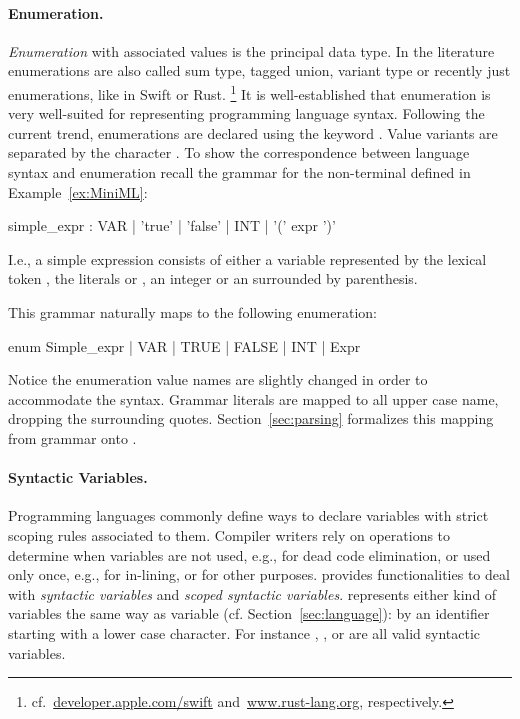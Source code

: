 \paragraph{Enumeration.} 
\emph{Enumeration} with associated values is the principal \Tosca data type.
In the literature enumerations are also called sum type, tagged union, 
variant type or recently just enumerations, like in Swift or Rust.%
\footnote{cf.~\href{https://developer.apple.com/swift/}{developer.apple.com/swift} 
and~\href{https://www.rust-lang.org/}{www.rust-lang.org}, respectively.}
It is well-established that enumeration is very well-suited for
 representing programming language syntax.
 Following the current trend, \Tosca enumerations are declared
 using the keyword .  Value variants are separated
 by the character \ToscaIn{|}. To show the correspondence between
 language syntax and enumeration recall the \antlr grammar for 
 the non-terminal  defined in Example~\ref{ex:MiniML}:
%
\begin{lstANTLR}
simple_expr : VAR | 'true' | 'false' | INT
            | '(' expr ')' 
\end{lstANTLR}
%
I.e., a simple expression consists of either a variable represented by the
lexical token , the literals  or
, an integer or an  surrounded by
parenthesis. 

\begin{example}

This grammar naturally maps to the following enumeration:
%  
\begin{lstTosca}
enum Simple_expr | VAR | TRUE | FALSE 
                   | INT | Expr
\end{lstTosca}

\end{example}
%
Notice the enumeration value names are slightly changed in order to
accommodate the \Tosca syntax. Grammar literals are mapped to 
all upper case name, dropping the surrounding quotes. Section~\ref{sec:parsing}
formalizes this mapping from \antlr grammar onto \Tosca.

\paragraph{Syntactic Variables.} Programming languages commonly define ways to
declare variables
with strict scoping rules associated to
them. Compiler writers rely on operations to determine when variables
are not used, e.g., for dead code elimination, or used only once, e.g., for in-lining, 
or for other purposes.
\Tosca provides
functionalities to deal with \emph{syntactic variables} and \emph{scoped
  syntactic variables}. \Tosca represents either kind of variables 
  the same way as variable (cf. Section~\ref{sec:language}): by an identifier starting 
  with a lower case character. For instance
, , or
 are all valid syntactic variables.

